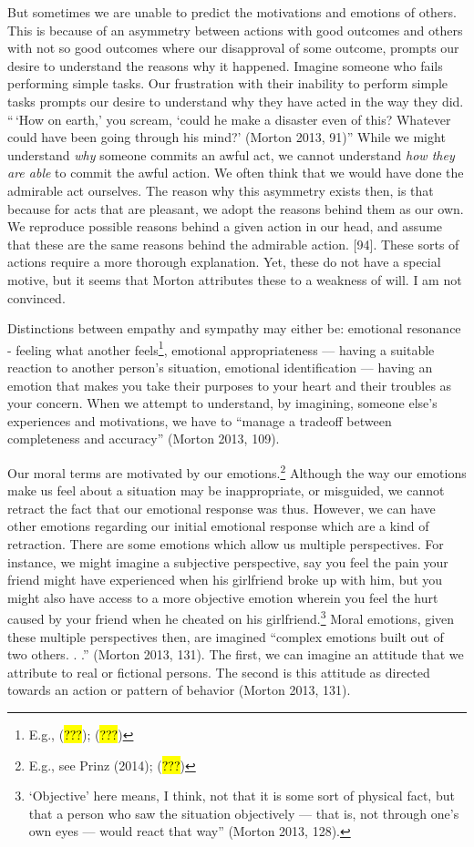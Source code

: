 \documentclass[
  letterpaper,
  DIV=11,
  numbers=noendperiod]{scrartcl}
\theoremstyle{remark}
\begin{document}
But sometimes we are unable to predict the motivations and emotions of
others. This is because of an asymmetry between actions with good
outcomes and others with not so good outcomes where our disapproval of
some outcome, prompts our desire to understand the reasons why it
happened. Imagine someone who fails performing simple tasks. Our
frustration with their inability to perform simple tasks prompts our
desire to understand why they have acted in the way they did. ``\,`How
on earth,' you scream, `could he make a disaster even of this? Whatever
could have been going through his mind?' (Morton 2013, 91)'' While we
might understand \emph{why} someone commits an awful act, we cannot
understand \emph{how they are able} to commit the awful action. We often
think that we would have done the admirable act ourselves. The reason
why this asymmetry exists then, is that because for acts that are
pleasant, we adopt the reasons behind them as our own. We reproduce
possible reasons behind a given action in our head, and assume that
these are the same reasons behind the admirable action. {[}94{]}. These
sorts of actions require a more thorough explanation. Yet, these do not
have a special motive, but it seems that Morton attributes these to a
weakness of will. I am not convinced.

Distinctions between empathy and sympathy may either be: emotional
resonance - feeling what another feels\footnote{E.g., (\hl{???});
  (\hl{???})}, emotional appropriateness --- having a suitable reaction
to another person's situation, emotional identification --- having an
emotion that makes you take their purposes to your heart and their
troubles as your concern. When we attempt to understand, by imagining,
someone else's experiences and motivations, we have to ``manage a
tradeoff between completeness and accuracy'' (Morton 2013, 109).

Our moral terms are motivated by our emotions.\footnote{E.g., see Prinz
  (2014); (\hl{???})} Although the way our emotions make us feel about a
situation may be inappropriate, or misguided, we cannot retract the fact
that our emotional response was thus. However, we can have other
emotions regarding our initial emotional response which are a kind of
retraction. There are some emotions which allow us multiple
perspectives. For instance, we might imagine a subjective perspective,
say you feel the pain your friend might have experienced when his
girlfriend broke up with him, but you might also have access to a more
objective emotion wherein you feel the hurt caused by your friend when
he cheated on his girlfriend.\footnote{`Objective' here means, I think,
  not that it is some sort of physical fact, but that a person who saw
  the situation objectively --- that is, not through one's own eyes ---
  would react that way'' (Morton 2013, 128).} Moral emotions, given
these multiple perspectives then, are imagined ``complex emotions built
out of two others. . .'' (Morton 2013, 131). The first, we can imagine
an attitude that we attribute to real or fictional persons. The second
is this attitude as directed towards an action or pattern of behavior
(Morton 2013, 131).
\end{document}
